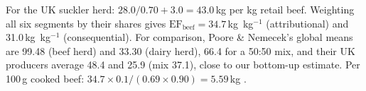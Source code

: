 For the UK suckler herd: $28.0/0.70 + 3.0 = 43.0$\,kg \COtwoe{} per kg retail beef. Weighting all six segments by their shares gives $\mathrm{EF}_{\mathrm{beef}} = 34.7$\,kg \COtwoe\,kg$^{-1}$ (attributional) and 31.0\,kg \COtwoe\,kg$^{-1}$ (consequential). For comparison, Poore \& Nemecek's global means are 99.48 (beef herd) and 33.30 (dairy herd), 66.4 for a 50:50 mix, and their UK producers average 48.4 and 25.9 (mix 37.1), close to our bottom-up estimate. Per 100\,g cooked beef: $34.7\times 0.1/(0.69\times0.90) = 5.59$\,kg \COtwoe.
